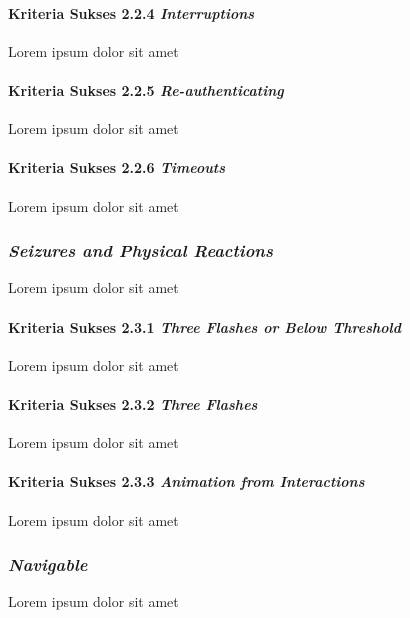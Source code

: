 \paragraph{Kriteria Sukses 2.2.4 \textit{Interruptions}}
\label{sec:kriteria_sukses_2.2.4}
Lorem ipsum dolor sit amet

\paragraph{Kriteria Sukses 2.2.5 \textit{Re-authenticating}}
\label{sec:kriteria_sukses_2.2.5}
Lorem ipsum dolor sit amet

\paragraph{Kriteria Sukses 2.2.6 \textit{Timeouts}}
\label{sec:kriteria_sukses_2.2.6}
Lorem ipsum dolor sit amet

\subsubsection{\textit{Seizures and Physical Reactions}}
\label{sec:seizures_and_physical_reactions}
Lorem ipsum dolor sit amet

\paragraph{Kriteria Sukses 2.3.1 \textit{Three Flashes or Below Threshold}}
\label{sec:kriteria_sukses_2.3.1}
Lorem ipsum dolor sit amet

\paragraph{Kriteria Sukses 2.3.2 \textit{Three Flashes}}
\label{sec:kriteria_sukses_2.3.2}
Lorem ipsum dolor sit amet

\paragraph{Kriteria Sukses 2.3.3 \textit{Animation from Interactions}}
\label{sec:kriteria_sukses_2.3.3}
Lorem ipsum dolor sit amet

\subsubsection{\textit{Navigable}}
\label{sec:navigable}
Lorem ipsum dolor sit amet

